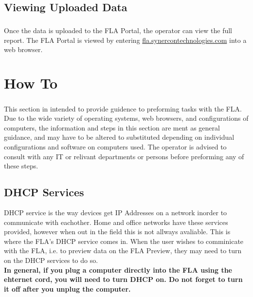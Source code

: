 \documentclass[11pt, oneside]{book}
\begin{document}
\section{Viewing Uploaded Data}
\paragraph{  }
Once the data is uploaded to the FLA Portal, the operator can view the full report. The FLA Portal is viewed by entering \url{fla.synercontechnologies.com} into a web browser.

\chapter{How To}
\paragraph{  }
This section in intended to provide guidence to preforming tasks with the FLA. Due to the wide variety of operating systems, web browsers, and configurations of computers, the information and steps in this section are ment as general guidance, and may have to be altered to substituted depending on individual configurations and software on computers used. The operator is advised to consult with any IT or relivant departments or persons before preforming any of these steps.
\section{DHCP Services}\label{sec:dhcp_service}
\label{subsec:dhcp_services}
DHCP service is the way devices get IP Addresses on a network inorder to communicate with eachother. Home and office networks have these services provided, however when out in the field this is not allways avaliable. This is where the FLA's DHCP service comes in. When the user wishes to comminicate with the FLA, i.e. to preview data on the FLA Preview, they may need to turn on the DHCP services to do so.\\
\textbf{In general, if you plug a computer directly into the FLA using the ehternet cord, you will need to turn DHCP on. Do not forget to turn it off after you unplug the computer.}
\end{document}
